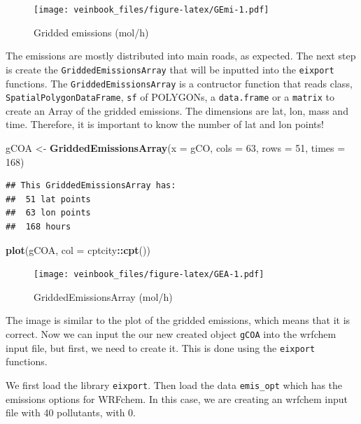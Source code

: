 \documentclass[12pt,graybox,envcountchap,sectrefs]{krantz}
\makeatletter
\newenvironment{Shaded}{\begin{snugshade}}{\end{snugshade}}
\newcommand{\KeywordTok}[1]{\textcolor[rgb]{0.13,0.29,0.53}{\textbf{#1}}}
\newcommand{\DataTypeTok}[1]{\textcolor[rgb]{0.13,0.29,0.53}{#1}}
\newcommand{\DecValTok}[1]{\textcolor[rgb]{0.00,0.00,0.81}{#1}}
\newcommand{\StringTok}[1]{\textcolor[rgb]{0.31,0.60,0.02}{#1}}
\newcommand{\OperatorTok}[1]{\textcolor[rgb]{0.81,0.36,0.00}{\textbf{#1}}}
\newcommand{\NormalTok}[1]{#1}
\newenvironment{kframe}{%
\medskip{}
\setlength{\fboxsep}{.8em}
 \def\at@end@of@kframe{}%
 \ifinner\ifhmode%
  \def\at@end@of@kframe{\end{minipage}}%
  \begin{minipage}{\columnwidth}%
 \fi\fi%
 \def\FrameCommand##1{\hskip\@totalleftmargin \hskip-\fboxsep
 \colorbox{shadecolor}{##1}\hskip-\fboxsep
     \hskip-\linewidth \hskip-\@totalleftmargin \hskip\columnwidth}%
 \MakeFramed {\advance\hsize-\width
   \@totalleftmargin\z@ \linewidth\hsize
   \@setminipage}}%
 {\par\unskip\endMakeFramed%
 \at@end@of@kframe}
\renewenvironment{Shaded}{\begin{kframe}}{\end{kframe}}
\theoremstyle{definition}
\theoremstyle{definition}
\theoremstyle{definition}
\theoremstyle{remark}
\makeatother
\begin{document}
\begin{figure}
\centering
\texttt{[image: veinbook\_files/figure-latex/GEmi-1.pdf]}
\caption{\label{fig:GEmi}Gridded emissions (mol/h)}
\end{figure}

The emissions are mostly distributed into main roads, as expected. The
next step is create the \texttt{GriddedEmissionsArray} that will be
inputted into the \texttt{eixport} functions. The
\texttt{GriddedEmissionsArray} is a contructor function that reads
class, \texttt{SpatialPolygonDataFrame}, \texttt{sf} of POLYGONs, a
\texttt{data.frame} or a \texttt{matrix} to create an Array of the
gridded emissions. The dimensions are lat, lon, mass and time.
Therefore, it is important to know the number of lat and lon points!

\begin{Shaded}
\begin{Highlighting}[]
\NormalTok{gCOA <-}\StringTok{ }\KeywordTok{GriddedEmissionsArray}\NormalTok{(}\DataTypeTok{x =}\NormalTok{ gCO, }\DataTypeTok{cols =} \DecValTok{63}\NormalTok{, }\DataTypeTok{rows =} \DecValTok{51}\NormalTok{, }\DataTypeTok{times =} \DecValTok{168}\NormalTok{)}
\end{Highlighting}
\end{Shaded}

\begin{verbatim}
## This GriddedEmissionsArray has:
##  51 lat points
##  63 lon points
##  168 hours
\end{verbatim}

\begin{Shaded}
\begin{Highlighting}[]
\KeywordTok{plot}\NormalTok{(gCOA, }\DataTypeTok{col =}\NormalTok{ cptcity}\OperatorTok{::}\KeywordTok{cpt}\NormalTok{())}
\end{Highlighting}
\end{Shaded}

\begin{figure}
\centering
\texttt{[image: veinbook\_files/figure-latex/GEA-1.pdf]}
\caption{\label{fig:GEA}GriddedEmissionsArray (mol/h)}
\end{figure}

The image is similar to the plot of the gridded emissions, which means
that it is correct. Now we can input the our new created object
\texttt{gCOA} into the wrfchem input file, but first, we need to create
it. This is done using the \texttt{eixport} functions.

We first load the library \texttt{eixport}. Then load the data
\texttt{emis\_opt} which has the emissions options for WRFchem. In this
case, we are creating an wrfchem input file with 40 pollutants, with 0.
\end{document}
